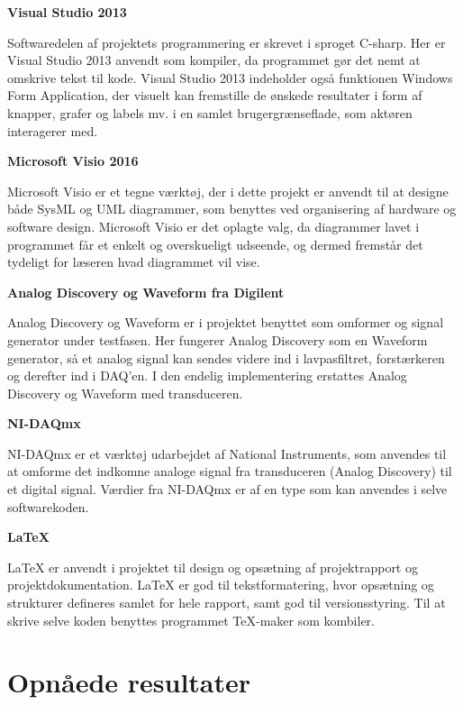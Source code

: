 \textbf{Visual Studio 2013}

Softwaredelen af projektets programmering er skrevet i sproget C-sharp. Her er Visual Studio 2013 anvendt som kompiler, da programmet gør det nemt at omskrive tekst til kode. Visual Studio 2013 indeholder også funktionen Windows Form Application, der visuelt kan fremstille de ønskede resultater i form af knapper, grafer og labels mv. i en samlet brugergrænseflade, som aktøren interagerer med. 

\textbf{Microsoft Visio 2016}

Microsoft Visio er et tegne værktøj, der i dette projekt er anvendt til at designe både SysML og UML diagrammer, som benyttes ved organisering af hardware og software design. Microsoft Visio er det oplagte valg, da diagrammer lavet i programmet får et enkelt og overskueligt udseende, og dermed fremstår det tydeligt for læseren hvad diagrammet vil vise.

\textbf{Analog Discovery og Waveform fra Digilent}

Analog Discovery og Waveform er i projektet benyttet som omformer og signal generator under testfasen. Her fungerer Analog Discovery som en Waveform generator, så et analog signal kan sendes videre ind i lavpasfiltret, forstærkeren og derefter ind i DAQ’en. I den endelig implementering erstattes Analog Discovery og Waveform med transduceren. 

\textbf{NI-DAQmx}

NI-DAQmx er et værktøj udarbejdet af National Instruments, som anvendes til at omforme det indkomne analoge signal fra transduceren (Analog Discovery) til et digital signal. Værdier fra NI-DAQmx er af en type som kan anvendes i selve softwarekoden. 

\textbf{LaTeX}

LaTeX er anvendt i projektet til design og opsætning af projektrapport og projektdokumentation. LaTeX er god til tekstformatering, hvor opsætning og strukturer defineres samlet for hele rapport, samt god til versionsstyring. Til at skrive selve koden benyttes programmet TeX-maker som kombiler. 

\section{Opnåede resultater}




